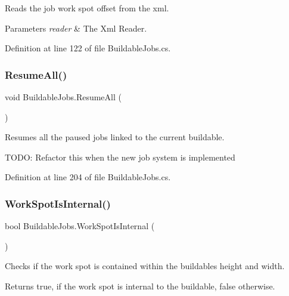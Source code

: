 Reads the job work spot offset from the xml. 


\begin{DoxyParams}{Parameters}
{\em reader} & The Xml Reader.\\
\hline
\end{DoxyParams}


Definition at line 122 of file Buildable\+Jobs.\+cs.

\mbox{\label{class_buildable_jobs_a79e890b27c8b98c6379026d1f4c039b8}} 
\subsubsection{\texorpdfstring{Resume\+All()}{ResumeAll()}}
{\footnotesize\ttfamily void Buildable\+Jobs.\+Resume\+All (\begin{DoxyParamCaption}{ }\end{DoxyParamCaption})}



Resumes all the paused jobs linked to the current buildable. 

T\+O\+DO\+: Refactor this when the new job system is implemented 

Definition at line 204 of file Buildable\+Jobs.\+cs.

\mbox{\label{class_buildable_jobs_ae2c9644155b5d308a251231b6b07fdac}} 
\subsubsection{\texorpdfstring{Work\+Spot\+Is\+Internal()}{WorkSpotIsInternal()}}
{\footnotesize\ttfamily bool Buildable\+Jobs.\+Work\+Spot\+Is\+Internal (\begin{DoxyParamCaption}{ }\end{DoxyParamCaption})}



Checks if the work spot is contained within the buildable\textquotesingle{}s height and width. 

\begin{DoxyReturn}{Returns}
{\ttfamily true}, if the work spot is internal to the buildable, {\ttfamily false} otherwise.
\end{DoxyReturn}


